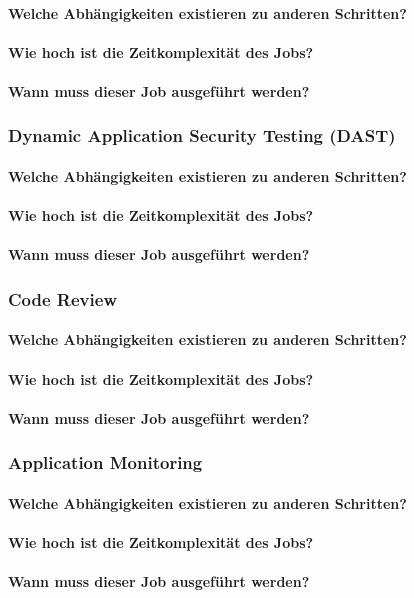 \paragraph{Welche Abhängigkeiten existieren zu anderen Schritten?}
\paragraph{Wie hoch ist die Zeitkomplexität des Jobs?}
\paragraph{Wann muss dieser Job ausgeführt werden?}

\subsubsection{Dynamic Application Security Testing (DAST)}\label{subsubsec:dast}
\paragraph{Welche Abhängigkeiten existieren zu anderen Schritten?}
\paragraph{Wie hoch ist die Zeitkomplexität des Jobs?}
\paragraph{Wann muss dieser Job ausgeführt werden?}

\subsubsection{Code Review}
\paragraph{Welche Abhängigkeiten existieren zu anderen Schritten?}
\paragraph{Wie hoch ist die Zeitkomplexität des Jobs?}
\paragraph{Wann muss dieser Job ausgeführt werden?}

\subsubsection{Application Monitoring}
\paragraph{Welche Abhängigkeiten existieren zu anderen Schritten?}
\paragraph{Wie hoch ist die Zeitkomplexität des Jobs?}
\paragraph{Wann muss dieser Job ausgeführt werden?}
